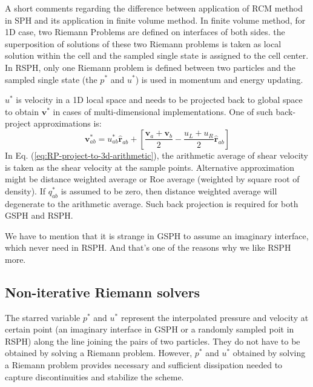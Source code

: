 A short comments regarding the difference between application of RCM method in SPH and its application in finite volume method. In finite volume method, for 1D case, two Riemann Problems are defined on interfaces of both sides. the superposition of solutions of these two Riemann problems is taken as local solution within the cell and the sampled single state is assigned to the cell center. In RSPH, only one Riemann problem is defined between two particles and the sampled single state (the $p^{\ast}$ and $u^{\ast}$) is used in momentum and energy updating.

$u^{\ast}$ is velocity in a 1D local space and needs to be projected back to global space to obtain $\textbf{v}^{\ast}$ in cases of multi-dimensional implementations. One of such back-project approximations is:
\begin{equation}
\textbf{v}^{\ast}_{a b}=u^{\ast}_{a b} \hat{\textbf{r}}_{a b} + \left [\frac{\textbf{v}_{a} + \textbf{v}_{b}}{2} - \frac{u_L + u_R}{2} \hat{\textbf{r}}_{a b}\right]
\label{eq:RP-project-to-3d-arithmetic}
\end{equation}
In Eq. (\ref{eq:RP-project-to-3d-arithmetic}), the arithmetic average of shear velocity is taken as the shear velocity at the sample points. Alternative approximation might be distance weighted average or Roe average (weighted by square root of density). If $q_{a b}^{\ast}$ is assumed to be zero, then distance weighted average will degenerate to the arithmetic average.
Such back projection is required for both GSPH and RSPH.

We have to mention that it is strange in GSPH to assume an imaginary interface, which never need in RSPH. And that's one of the reasons why we like RSPH more.

\subsection{Non-iterative Riemann solvers} \label{sec:RP-solver}
The starred variable $p^{\ast}$ and $u^{\ast}$ represent the interpolated pressure and velocity at certain point (an imaginary interface in GSPH or a randomly sampled poit in RSPH) along the line joining the pairs of two particles. They do not have to be obtained by solving a Riemann problem. However, $p^{\ast}$ and $u^{\ast}$ obtained by solving a Riemann problem provides necessary and sufficient dissipation needed to capture discontinuities and stabilize the scheme.

